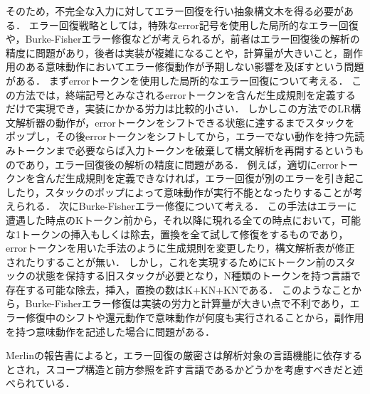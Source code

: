 \documentclass[fontsize=9bp,twocolumn,column_gap=2.36zw,a4paper,report]{jlreq}
\begin{document}
\begin{figure}[h]
\end{figure}

\begin{figure}[h]
\end{figure}


\begin{figure}[h]
\end{figure}

そのため，不完全な入力に対してエラー回復を行い抽象構文木を得る必要がある．
エラー回復戦略としては，特殊なerror記号を使用した局所的なエラー回復や，Burke-Fisherエラー修復などが考えられるが，前者はエラー回復後の解析の精度に問題があり，後者は実装が複雑になることや，計算量が大きいこと，副作用のある意味動作においてエラー修復動作が予期しない影響を及ぼすという問題がある．
まずerrorトークンを使用した局所的なエラー回復について考える．
この方法では，終端記号とみなされるerrorトークンを含んだ生成規則を定義するだけで実現でき，実装にかかる労力は比較的小さい．
しかしこの方法でのLR構文解析器の動作が，errorトークンをシフトできる状態に達するまでスタックをポップし，その後errorトークンをシフトしてから，エラーでない動作を持つ先読みトークンまで必要ならば入力トークンを破棄して構文解析を再開するというものであり，エラー回復後の解析の精度に問題がある．
例えば，適切にerrorトークンを含んだ生成規則を定義できなければ，エラー回復が別のエラーを引き起こしたり，スタックのポップによって意味動作が実行不能となったりすることが考えられる．
次にBurke-Fisherエラー修復について考える．
この手法はエラーに遭遇した時点のKトークン前から，それ以降に現れる全ての時点において，可能な1トークンの挿入もしくは除去，置換を全て試して修復をするものであり，errorトークンを用いた手法のように生成規則を変更したり，構文解析表が修正されたりすることが無い．
しかし，これを実現するためにKトークン前のスタックの状態を保持する旧スタックが必要となり，N種類のトークンを持つ言語で存在する可能な除去，挿入，置換の数はK+K\cdot N+K\cdot Nである．
このようなことから，Burke-Fisherエラー修復は実装の労力と計算量が大きい点で不利であり，エラー修復中のシフトや還元動作で意味動作が何度も実行されることから，副作用を持つ意味動作を記述した場合に問題がある．\par
Merlinの報告書\cite{merlin}によると，エラー回復の厳密さは解析対象の言語機能に依存するとされ，スコープ構造と前方参照を許す言語であるかどうかを考慮すべきだと述べられている．
\end{document}
